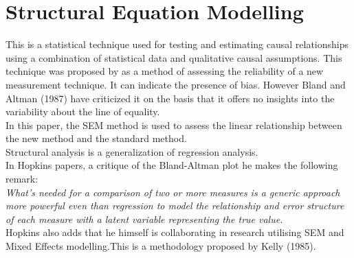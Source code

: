 
\section{Structural Equation Modelling}
This is a statistical technique used for testing and estimating causal relationships using a combination of statistical data and qualitative causal assumptions. This technique was proposed by \citet{Lewis} as a method of assessing the reliability of a new measurement technique. It can indicate the presence of bias. However Bland and Altman (1987) have criticized it on the basis that it offers no insights into the variability about the line of equality.
\\
In this paper, the SEM method is used to assess the linear relationship between the new method and the standard method.
\\
Structural analysis is a generalization of regression analysis.
\\
In Hopkins papers, a critique of the Bland-Altman plot he makes the following remark:
\\
\emph{What's needed for a comparison of two or more measures is a
generic approach more powerful even than regression to model the
relationship and error structure of each measure with a latent
variable representing the true value.}
\\
Hopkins also adds that he himself is collaborating in research utilising SEM and Mixed Effects modelling.This is a methodology proposed by Kelly (1985).